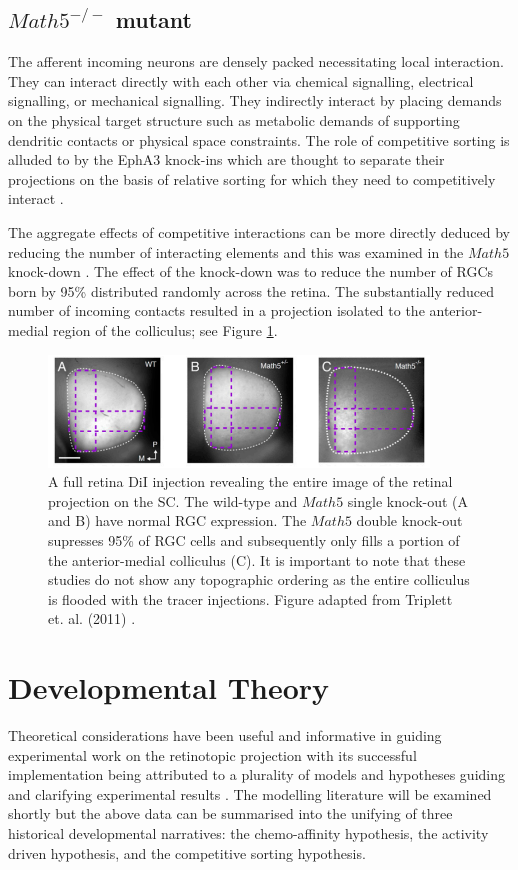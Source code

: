 \subsection{$Math5^{-/-}$ mutant}
The afferent incoming neurons are densely packed necessitating local interaction. They can interact directly with each other via chemical signalling, electrical signalling, or mechanical signalling. They indirectly interact by placing demands on the physical target structure such as metabolic demands of supporting dendritic contacts or physical space constraints. The role of competitive sorting is alluded to by the EphA3 knock-ins which are thought to separate their projections on the basis of relative sorting for which they need to competitively interact \cite{Reber2004-wq, Brown2000-da}. 

The aggregate effects of competitive interactions can be more directly deduced by reducing the number of interacting elements and this was examined in the $Math5$ knock-down \cite{Triplett2011-jk}. The effect of the knock-down was to reduce the number of RGCs born by 95\% distributed randomly across the retina. The substantially reduced number of incoming contacts resulted in a projection isolated to the anterior-medial region of the colliculus; see Figure \ref{fig:math5}.

\begin{figure}
	\centering
	\includegraphics[width = 0.9\textwidth]{images/introduction/math5}
	\def\c{A full retina DiI injection revealing the entire image of the retinal projection on the SC. }
	\caption[\c]{\label{fig:math5} \c The wild-type and $Math5$ single knock-out (A and B) have normal RGC expression. The $Math5$ double knock-out supresses 95\% of RGC cells and subsequently only fills a portion of the anterior-medial colliculus (C). It is important to note that these studies do not show any topographic ordering as the entire colliculus is flooded with the tracer injections. Figure adapted from Triplett et. al. (2011) \cite{Triplett2011-jk}.}
\end{figure}

\FloatBarrier
\section{Developmental Theory  \label{section:developmentaltheory}}
Theoretical considerations have been useful and informative in guiding experimental work on the retinotopic projection with its successful implementation being attributed to a plurality of models and hypotheses guiding and clarifying experimental results \cite{Goodhill2018-ca}. The modelling literature will be examined shortly but the above data can be summarised into the unifying of three historical developmental narratives: the chemo-affinity hypothesis, the activity driven hypothesis, and the competitive sorting hypothesis.

